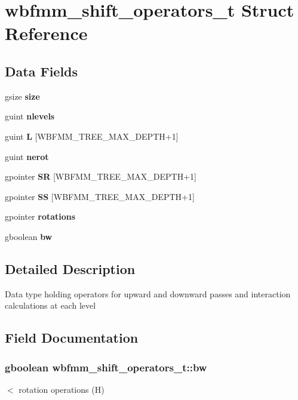 \section{wbfmm\+\_\+shift\+\_\+operators\+\_\+t Struct Reference}
\label{structwbfmm__shift__operators__t}
\subsection*{Data Fields}
\begin{DoxyCompactItemize}
\item 
gsize {\bf size}
\item 
guint {\bf nlevels}
\item 
guint {\bf L} [W\+B\+F\+M\+M\+\_\+\+T\+R\+E\+E\+\_\+\+M\+A\+X\+\_\+\+D\+E\+P\+T\+H+1]
\item 
guint {\bf nerot}
\item 
gpointer {\bf S\+R} [W\+B\+F\+M\+M\+\_\+\+T\+R\+E\+E\+\_\+\+M\+A\+X\+\_\+\+D\+E\+P\+T\+H+1]
\item 
gpointer {\bf S\+S} [W\+B\+F\+M\+M\+\_\+\+T\+R\+E\+E\+\_\+\+M\+A\+X\+\_\+\+D\+E\+P\+T\+H+1]
\item 
gpointer {\bf rotations}
\item 
gboolean {\bf bw}
\end{DoxyCompactItemize}


\subsection{Detailed Description}
Data type holding operators for upward and downward passes and interaction calculations at each level 

\subsection{Field Documentation}
\subsubsection[{bw}]{\setlength{\rightskip}{0pt plus 5cm}gboolean wbfmm\+\_\+shift\+\_\+operators\+\_\+t\+::bw}\label{structwbfmm__shift__operators__t_a7b954cf58adf65af100fb787d69cf3c7}
$<$ rotation operations (H) 
